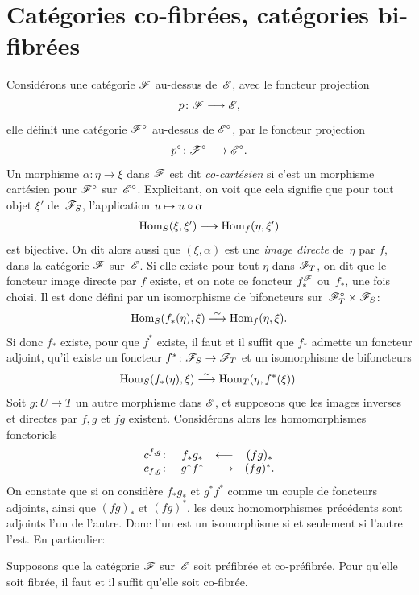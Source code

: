 \section{Cat\'egories co-fibr\'ees, cat\'egories bi-fibr\'ees}
\label{VI.10}
Consid\'erons une cat\'egorie $\cal{F}$ au-dessus de~$\cal{E}$,
avec le foncteur projection
$$
p\colon \cal{F}\to \cal{E},
$$
elle d\'efinit une cat\'egorie $\cal{F}^\circ$ au-dessus de
$\cal{E}^\circ$, par le foncteur projection
$$
p^\circ\colon \cal{F}^\circ\to \cal{E}^\circ.
$$
Un morphisme $\alpha\colon \eta\to\xi$ dans $\cal{F}$ est dit
\emph{co-cartésien} si c'est un morphisme cart\'esien pour
$\cal{F}^\circ$ sur~$\cal{E}^\circ$. Explicitant, on voit que cela
signifie que pour tout objet $\xi'$ de~$\cal{F}_S$, l'application
$u\mto u\circ \alpha$
$$
\Hom_S(\xi,\xi')\to\Hom_f(\eta,\xi')
$$
est bijective. On dit alors aussi que $(\xi,\alpha)$ est une
\emph{image directe}
de~$\eta$ par $f$, dans la cat\'egorie $\cal{F}$ sur~$\cal{E}$. Si
elle existe pour tout $\eta$ dans $\cal{F}_T$, on dit que le foncteur
image directe par $f$ existe, et on note ce foncteur
$f_*^{\cal{F}}$ ou~$f_*$,
\label{indnot:ft}une fois choisi. Il est donc d\'efini par
un isomorphisme de bifoncteurs sur~$\cal{F}_T^\circ\times\cal{F}_S$:
$$
\operatorname{Hom}_S(f_*(\eta),\xi)\overset{\sim}{\longrightarrow} \operatorname{Hom}_f(\eta,\xi).
$$
Si donc $f_*$ existe, pour que $f^*$ existe, il faut et il suffit que
$f_*$
admette un foncteur adjoint, \ie qu'il existe un foncteur
$f^*\colon \cal{F}_S\to\cal{F}_T$ et un isomorphisme de bifoncteurs
$$
\operatorname{Hom}_S(f_*(\eta),\xi)\overset{\sim}{\longrightarrow} \operatorname{Hom}_T(\eta,f^*(\xi)).
$$
Soit $g\colon U\to T$ un autre morphisme dans $\cal{E}$, et supposons
que les images inverses et directes par $f,g$ et $fg$
existent. Consid\'erons alors les homomorphismes fonctoriels
$$
\begin{array}{cccc}
c^{f,g}\colon&f_*g_*&\dpl\from&(fg)_*\\
c_{f,g}\colon&g^*f^*&\dpl\to&(fg)^*.
\end{array}
$$
On constate que si on consid\`ere $f_*g_*$ et $g^*f^*$ comme un
couple de foncteurs adjoints, ainsi que $(fg)_*$ et $(fg)^*$, les deux
homomorphismes pr\'ec\'edents sont adjoints l'un de l'autre. Donc
l'un est un isomorphisme si et seulement si l'autre l'est. En
particulier:
\begin{proposition}
\label{VI.10.1} Supposons que la cat\'egorie $\cal{F}$ sur~$\cal{E}$
soit pr\'efibr\'ee et co-pr\'efibr\'ee. Pour qu'elle soit
fibr\'ee, il faut et il suffit qu'elle soit
co-fibr\'ee.
\end{proposition}


